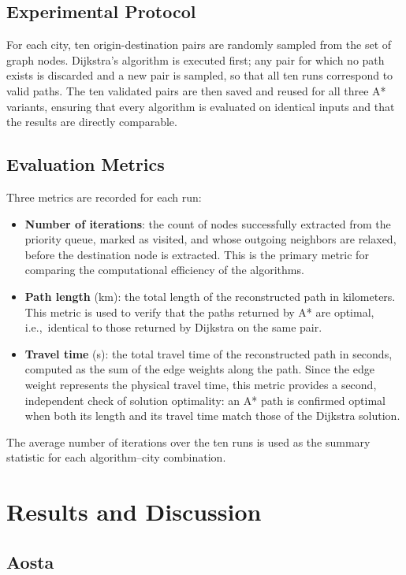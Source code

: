 \documentclass[12pt,a4paper]{article}
\begin{document}
\subsection{Experimental Protocol}

For each city, ten origin-destination pairs are randomly sampled from the set of graph nodes.
Dijkstra's algorithm is executed first; any pair for which no path exists is discarded and a new pair is sampled, so that all ten runs correspond to valid paths.
The ten validated pairs are then saved and reused for all three A* variants, ensuring that every algorithm is evaluated on identical inputs and that the results are directly comparable.

\subsection{Evaluation Metrics}

Three metrics are recorded for each run:
\begin{itemize}
  \item \textbf{Number of iterations}: the count of nodes successfully extracted from the priority queue, marked as visited, and whose outgoing neighbors are relaxed, before the destination node is extracted. This is the primary metric for comparing the computational efficiency of the algorithms.
  \item \textbf{Path length} (km): the total length of the reconstructed path in kilometers. This metric is used to verify that the paths returned by A* are optimal, i.e.,\ identical to those returned by Dijkstra on the same pair.
  \item \textbf{Travel time} (s): the total travel time of the reconstructed path in seconds, computed as the sum of the edge weights along the path. Since the edge weight represents the physical travel time, this metric provides a second, independent check of solution optimality: an A* path is confirmed optimal when both its length and its travel time match those of the Dijkstra solution.
\end{itemize}

The average number of iterations over the ten runs is used as the summary statistic for each algorithm–city combination.

\section{Results and Discussion}

\subsection{Aosta}\label{sec:results_aosta}
\end{document}
